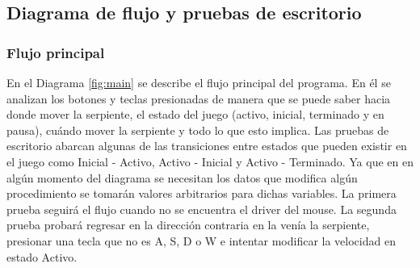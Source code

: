 \documentclass[12pt]{article}
\begin{document}
\subsection*{Diagrama de flujo y pruebas de escritorio}
\subsubsection*{Flujo principal}
En el Diagrama \ref{fig:main} se describe el flujo principal del programa. En él se analizan los botones y teclas presionadas de manera que se puede saber hacia donde mover la serpiente, el estado del juego (activo, inicial, terminado y en pausa), cuándo mover la serpiente y todo lo que esto implica. Las pruebas de escritorio abarcan algunas de las transiciones entre estados que pueden existir en el juego como Inicial - Activo, Activo - Inicial y Activo - Terminado. Ya que en en algún momento del diagrama se necesitan los datos que modifica algún procedimiento se tomarán valores arbitrarios para dichas variables. La primera prueba seguirá el flujo cuando no se encuentra el driver del mouse. La segunda prueba probará regresar en la dirección contraria en la venía la serpiente, presionar una tecla que no es A, S, D o W e intentar modificar la velocidad en estado Activo. 
\end{document}
